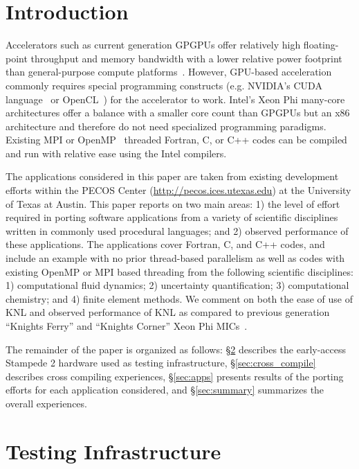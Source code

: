 \section{Introduction}
\label{sec:intro}

Accelerators such as current generation GPGPUs offer relatively high
floating-point throughput and memory bandwidth with a lower relative power
footprint than general-purpose compute platforms~\cite{gpu_hpc:2009}. However,
GPU-based acceleration commonly requires special programming constructs (e.g.
NVIDIA's CUDA language~\cite{nvidia2010programming} or
OpenCL~\cite{opencl_spec}) for the accelerator to work.
Intel's Xeon Phi many-core architectures offer a balance with a smaller core
count than GPGPUs
but an x86 architecture and therefore do not need specialized programming
paradigms.  Existing MPI or OpenMP~\cite{openmp_standard} threaded Fortran, C,
or C++ codes can be compiled and run with relative ease using the Intel compilers.

The applications considered in this paper are taken from existing development
efforts within the PECOS Center (\url{http://pecos.ices.utexas.edu}) at the
University of Texas at Austin.  This paper reports on two main areas: 1) the
level of effort required in porting software applications from a variety of
scientific disciplines written in commonly used procedural languages; and 2)
observed performance of these applications.  The applications cover Fortran, C,
and C++ codes, and include an example with no prior thread-based parallelism as
well as codes with existing OpenMP or MPI based threading from the following
scientific disciplines: 1) computational fluid dynamics; 2) uncertainty
quantification; 3) computational chemistry; and 4) finite element methods.  We
comment on both the ease of use of KNL and observed performance of KNL as
compared to previous generation ``Knights Ferry'' and ``Knights Corner'' Xeon
Phi MICs~\cite{schulz2012early}.

The remainder of the paper is organized as follows: \S\ref{sec:hardware}
describes the early-access Stampede 2 hardware used as testing infrastructure,
\S\ref{sec:cross_compile} describes cross compiling experiences,
\S\ref{sec:apps} presents results of the porting efforts for each application
considered, and \S\ref{sec:summary} summarizes the overall experiences.

\section{Testing Infrastructure}
\label{sec:hardware}

